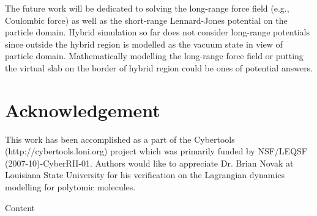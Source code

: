 \documentclass[]{aiaa-tc}%
\begin{document}
The future work will be dedicated to solving the long-range force
field (e.g., Coulombic force) as well as the short-range Lennard-Jones
potential on the particle domain. Hybrid simulation so far does not
consider long-range potentials since outside the hybrid region is
modelled as the vacuum state in view of particle domain. Mathematically
modelling the long-range force field or putting the virtual slab 
on the border of hybrid region could be ones of potential answers.



\section*{Acknowledgement}

This work has been accomplished as a part of the Cybertools
(http://cybertools.loni.org) project which was primarily funded by 
NSF/LEQSF (2007-10)-CyberRII-01. Authors would like to appreciate
Dr. Brian Novak at Louisiana State University for his verification on
the Lagrangian dynamics modelling for polytomic molecules.

Content





\end{document}
